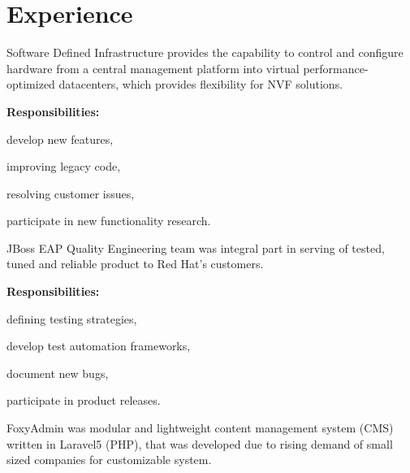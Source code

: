 \documentclass[a4paper]{deedy-resume}
\begin{document}
\begin{minipage}[t]{0.66\textwidth} %
\section{Experience}
\vspace{\topsep}
Software Defined Infrastructure provides the capability to control and configure hardware from a central management platform into virtual performance-optimized datacenters, which provides flexibility for NVF solutions.
 
\vspace{\topsep}
\textbf{Responsibilities:}
\vspace{\topsep}
\begin{tightitemize}
    \item develop new features,
    \item improving legacy code,
    \item resolving customer issues,
    \item participate in new functionality research.
\end{tightitemize}
\sectionspace
{}
\vspace{\topsep}
JBoss EAP Quality Engineering team was integral part in serving of tested, tuned and reliable product to Red Hat's customers.

\vspace{\topsep}
\textbf{Responsibilities:}
\vspace{\topsep}
\begin{tightitemize}
    \item defining testing strategies,
    \item develop test automation frameworks,
    \item document new bugs,
    \item participate in product releases.
\end{tightitemize}
\sectionspace
\vspace{\topsep}
FoxyAdmin was modular and lightweight content management system (CMS) written in Laravel5 (PHP), that was developed due to rising demand of small sized companies for customizable system.


\end{minipage}
\end{document}
